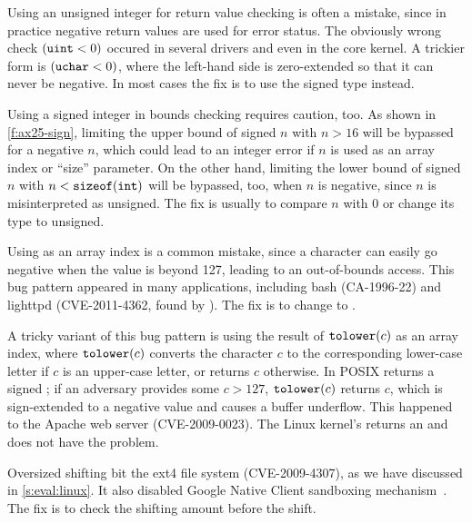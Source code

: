 Using an unsigned integer for return value checking is often a mistake,
since in practice negative return values are used for error status.
The obviously wrong check $(\texttt{uint} < 0)$ occured in several
drivers and even in the core kernel.  A trickier form is $(\texttt{uchar}
< 0)$, where the left-hand side is zero-extended so that it can
never be negative.  In most cases the fix is to use the signed type
instead.

Using a signed integer in bounds checking requires caution, too.  As
shown in \autoref{f:ax25-sign}, limiting the upper bound of signed
$n$ with $n > 16$ will be bypassed for a negative $n$, which could
lead to an integer error if $n$ is used as an array index or ``size''
parameter.  On the other hand, limiting the lower bound of signed
$n$ with $n < \texttt{sizeof}(\texttt{int})$ will be bypassed, too, when
$n$ is negative, since $n$ is misinterpreted as unsigned.  The fix
is usually to compare $n$ with 0 or change its type to unsigned.

Using  as an array index is a common mistake, since a
character can easily go negative when the value is beyond 127,
leading to an out-of-bounds access.  This bug pattern appeared
in many applications, including bash (CA-1996-22) and
lighttpd (CVE-2011-4362, found by \sys).  The fix is to
change  to .

A tricky variant of this bug pattern is using the result of
$\texttt{tolower}(c)$ as an array index, where $\texttt{tolower}(c)$ converts
the character $c$ to the corresponding lower-case letter if $c$ is
an upper-case letter, or returns $c$ otherwise.  In POSIX 
returns a signed ; if an adversary provides some $c > 127$,
$\texttt{tolower}(c)$ returns $c$, which is sign-extended to a negative
value and causes a buffer underflow.  This happened to the
Apache web server (CVE-2009-0023).  The Linux kernel's 
returns an  and does not have the problem.

Oversized shifting bit the ext4 file system (CVE-2009-4307),
as we have discussed in \autoref{s:eval:linux}.
It also disabled Google Native Client sandboxing mechanism~\cite{nacl}.
The fix is to check the shifting amount before the shift.

